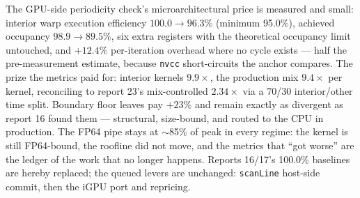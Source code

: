 \documentclass[
	english,
	letterpaper, oneside
]{article}
\begin{document}
The GPU-side periodicity check's microarchitectural price is measured and
small: interior warp execution efficiency $100.0 \to 96.3\%$ (minimum
95.0\%), achieved occupancy $98.9 \to 89.5\%$, six extra registers with
the theoretical occupancy limit untouched, and $+12.4\%$ per-iteration
overhead where no cycle exists --- half the pre-measurement estimate,
because \texttt{nvcc} short-circuits the anchor compares. The prize the
metrics paid for: interior kernels $9.9\times$, the production mix
$9.4\times$ per kernel, reconciling to report 23's mix-controlled
$2.34\times$ via a 70/30 interior/other time split. Boundary floor leaves
pay $+23\%$ and remain exactly as divergent as report 16 found them ---
structural, size-bound, and routed to the CPU in production. The FP64
pipe stays at $\sim$85\% of peak in every regime: the kernel is still
FP64-bound, the roofline did not move, and the metrics that ``got worse''
are the ledger of the work that no longer happens. Reports 16/17's
100.0\% baselines are hereby replaced; the queued levers are unchanged:
\texttt{scanLine} host-side commit, then the iGPU port and repricing.
\end{document}
